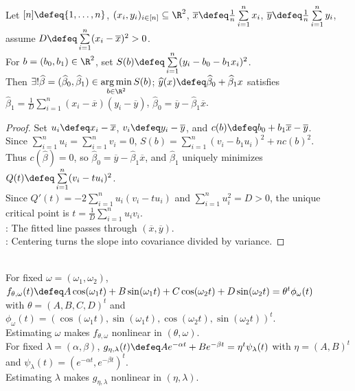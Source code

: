 \begin{proposition} \label{prop:simple-line-least-squares-formulas} \\
Let $[n]\defeq\{1,\ldots,n\}$, $(x_i,y_i)_{i\in[n]}\subseteq\R^2$, $\overline{x}\defeq \frac{1}{n}\sum\limits_{i=1}^{n}x_i$, $\overline{y}\defeq \frac{1}{n}\sum\limits_{i=1}^{n}y_i$, assume $D\defeq\sum\limits_{i=1}^{n}(x_i-\overline{x})^2>0$.\\
For $b=(b_0,b_1)\in\R^2$, set $S(b)\defeq\sum\limits_{i=1}^{n}(y_i-b_0-b_1x_i)^2$.\\
Then $\exists!\widehat{\beta}=(\widehat{\beta}_0,\widehat{\beta}_1)\in\operatorname*{arg\,min}\limits_{b\in\R^2}S(b)$; $\widehat{y}(x)\defeq\widehat{\beta}_0+\widehat{\beta}_1x$ satisfies $\widehat{\beta}_1=\frac{1}{D}\sum\limits_{i=1}^{n}(x_i-\overline{x})(y_i-\overline{y})$, $\widehat{\beta}_0=\overline{y}-\widehat{\beta}_1\overline{x}$.
\begin{proof} Set $u_i\defeq x_i-\overline{x}$, $v_i\defeq y_i-\overline{y}$, and $c(b)\defeq b_0+b_1\overline{x}-\overline{y}$.\\
Since $\sum\limits_{i=1}^{n}u_i=\sum\limits_{i=1}^{n}v_i=0$, $S(b)=\sum\limits_{i=1}^{n}(v_i-b_1u_i)^2+nc(b)^2$.\\
Thus $c(\widehat{\beta})=0$, so $\widehat{\beta}_0=\overline{y}-\widehat{\beta}_1\overline{x}$, and $\widehat{\beta}_1$ uniquely minimizes $Q(t)\defeq\sum\limits_{i=1}^{n}(v_i-tu_i)^2$.\\
Since $Q'(t)=-2\sum\limits_{i=1}^{n}u_i(v_i-tu_i)$ and $\sum\limits_{i=1}^{n}u_i^2=D>0$, the unique critical point is $t=\frac{1}{D}\sum\limits_{i=1}^{n}u_iv_i$.\\
: The fitted line passes through $(\overline{x},\overline{y})$.\\
: Centering turns the slope into covariance divided by variance.
\end{proof}
\end{proposition}

\begin{example} \label{ex:least-squares-linear-and-nonlinear-parameters} \\
For fixed $\omega=(\omega_1,\omega_2)$, $f_{\theta,\omega}(t)\defeq A\cos(\omega_1t)+B\sin(\omega_1t)+C\cos(\omega_2t)+D\sin(\omega_2t)=\theta^t\phi_\omega(t)$\\
with $\theta=(A,B,C,D)^t$ and $\phi_\omega(t)=(\cos(\omega_1t),\sin(\omega_1t),\cos(\omega_2t),\sin(\omega_2t))^t$.\\
Estimating $\omega$ makes $f_{\theta,\omega}$ nonlinear in $(\theta,\omega)$.\\
For fixed $\lambda=(\alpha,\beta)$, $g_{\eta,\lambda}(t)\defeq Ae^{-\alpha t}+Be^{-\beta t}=\eta^t\psi_\lambda(t)$ with $\eta=(A,B)^t$ and $\psi_\lambda(t)=(e^{-\alpha t},e^{-\beta t})^t$.\\
Estimating $\lambda$ makes $g_{\eta,\lambda}$ nonlinear in $(\eta,\lambda)$.
\end{example}

